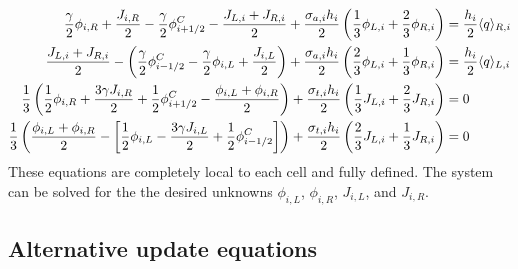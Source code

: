 \begin{align}
\frac{\gamma}{2}\phi_{i,R} + \frac{J_{i,R}}{2} -
    \frac{\gamma}{2}\phi_{{i+1/2}}^C    - \frac{J_{L,i} + J_{R,i}}{2} + \frac{\sigma_{a,i} h_i}{2} \left(\frac{1}{3} \phi_{L,i} +
    \frac{2}{3}\phi_{R,i}\right) &= \frac{h_i}{2} \langle q \rangle_{R,i} \\
    \frac{J_{L,i} + J_{R,i}}{2} -\left(\frac{\gamma}{2}\phi_{{i-1/2}}^C -
    \frac{\gamma}{2}\phi_{i,L} + \frac{J_{i,L}}{2}\right) + \frac{\sigma_{a,i} h_i}{2}
    \left(\frac{2}{3} \phi_{L,i} +
    \frac{1}{3}\phi_{R,i}\right) &= \frac{h_i}{2} \langle q \rangle_{L,i} \\
    \frac{1}{3}\left(\frac{1}{2}\phi_{i,R} + \frac{3\gamma J_{i,R}}{2} +
    \frac{1}{2}\phi_{{i+1/2}}^C - \frac{\phi_{i,L} + \phi_{i,R}}{2}\right) +
    \frac{\sigma_{t,i} h_i}{2} \left(\frac{1}{3} J_{L,i} + \frac{2}{3}J_{R,i}\right)
    &= 0 \\
    \frac{1}{3}\left(\frac{\phi_{i,L} + \phi_{i,R}}{2} - \left[\frac{1}{2}\phi_{i,L} - \frac{3\gamma J_{i,L}}{2} +
    \frac{1}{2}\phi_{{i-1/2}}^C\right] \right) +
    \frac{\sigma_{t,i} h_i}{2} \left(\frac{2}{3} J_{L,i} + \frac{1}{3}J_{R,i}\right)
    &= 0 
\end{align}
These equations are completely local to each cell and fully defined.  The system can be
solved for the the desired unknowns
$\phi_{i,L}$, $\phi_{i,R}$, $J_{i,L}$, and $J_{i,R}$.

\subsection{Alternative update equations}

